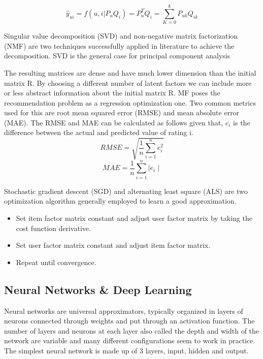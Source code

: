 \begin{equation}
    \hat{y}_{ui} = f(u,i|P_{u}Q_{i}) = P_{u}^{T}Q_{i} = \sum_{K=0}^{k}P_{uk}Q_{ik}
\end{equation}

Singular value decomposition (SVD) and non-negative matrix factorization (NMF) are two techniques successfully applied in literature to achieve the decomposition.
SVD is the general case for principal component analysis

The resulting matrices are dense and have much lower dimension than the initial matrix R. By choosing a different number of latent factors we can include more or less abstract information about the initial matrix R. MF poses the recommendation problem as a regression optimization one. Two common metrics used for this are root mean squared error (RMSE) and mean absolute error (MAE). The RMSE and MAE can be calculated as follows given that, \(e_i\) is the difference between the actual and predicted value of rating i. 
\begin{equation}
    RMSE = \sqrt{\frac{1}{n}\sum_{i=1}^{n}{e^2_i}}
\end{equation}
\begin{equation}
    MAE = \frac{1}{n}\sum_{i=1}^{n}{\mid e_i\mid}
\end{equation}

Stochastic gradient descent (SGD) and alternating least square (ALS) are two optimization algorithm generally employed to learn a good approximation.

\begin{itemize}
    \item Set item factor matrix constant and adjust user factor matrix by taking the cost function derivative.
    \item Set user factor matrix constant and adjust item factor matrix.
    \item Repeat until convergence.
\end{itemize}

\subsection{Neural Networks \& Deep Learning}
Neural networks are universal approximators, typically organized in layers of neurons connected through weights and put through an activation function. The number of layers and neurons at each layer also called the depth and width of the network are variable and many different configurations seem to work in practice. The simplest neural network is made up of 3 layers, input, hidden and output.

